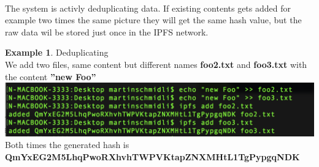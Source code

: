 \documentclass[a4paper,11pt, oneside]{report}
\theoremstyle{definition}
\newtheorem{exmp}{Example}[subsection]
\begin{document}
\noindent \\[0.3cm]
The system is activly deduplicating data. If existing contents gets added for example two times the same picture they will get the same hash value, but the raw data wil be stored just once in the IPFS network.
\begin{exmp}Deduplicating\\[0.3cm]
	We add two files, same content but different names \textbf{foo2.txt} and \textbf{foo3.txt} with the content \textbf{''new Foo''}\\[0.3cm]
	\includegraphics[width=\textwidth]{img/addFile06.png}\\[0.3cm]
	Both times the generated hash is \\ \textbf{QmYxEG2M5LhqPwoRXhvhTWPVKtapZNXMHtL1TgPypgqNDK}
\end{exmp}

\newpage

\newpage
\end{document}
